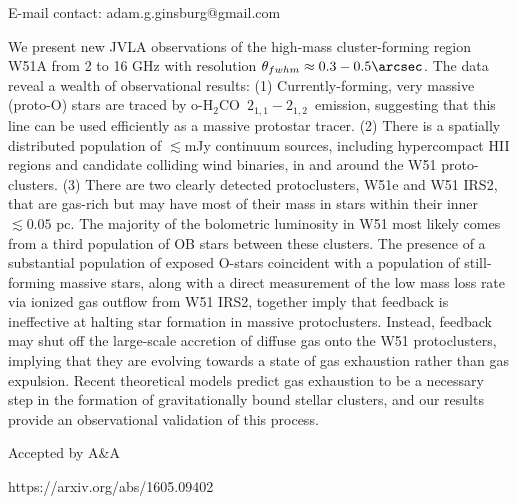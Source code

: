 \documentclass[]{article}
\newcommand{\ortho}{\ensuremath{\textrm{o-H}_2\textrm{CO}}\xspace}
\newcommand{\twotwo}{\ensuremath{2_{1,1}-2_{1,2}}\xspace}
\begin{document}

{E-mail contact: adam.g.ginsburg@gmail.com}





{
We present new JVLA observations of the high-mass cluster-forming region W51A
from 2 to 16 GHz with resolution
$\theta_{fwhm}\approx0.3-0.5\arcsec$.  The data reveal a wealth of
observational results:
(1) Currently-forming, very massive (proto-O) stars are traced by \ortho\ 
\twotwo\  emission, suggesting that this line can be used efficiently as a
massive protostar tracer.
(2) There is a spatially distributed population of $\lesssim$mJy continuum sources,
including hypercompact H{\sc II} regions and candidate colliding wind binaries,
in and around the W51 proto-clusters.  
(3) There are two clearly detected protoclusters, W51e and W51 IRS2, that are
gas-rich but may have most of their mass in stars within their inner $\lesssim0.05$
pc.  The
majority of the bolometric luminosity in W51 most likely comes from a third
population of OB stars between these clusters.
The presence of a substantial population of exposed O-stars coincident with
a population of still-forming massive stars, along with a direct measurement
of the low mass loss rate via ionized gas outflow from W51 IRS2, together imply
that feedback is ineffective at halting star formation in massive
protoclusters.  Instead, feedback may shut off the large-scale accretion of
diffuse gas onto the W51 protoclusters, implying that they are evolving towards
a state of gas exhaustion rather than gas expulsion. Recent theoretical models
predict gas exhaustion to be a necessary step in the formation of
gravitationally bound stellar clusters, and our results provide an
observational validation of this process.
}



{ Accepted by A\&A }



https://arxiv.org/abs/1605.09402
\end{document}
